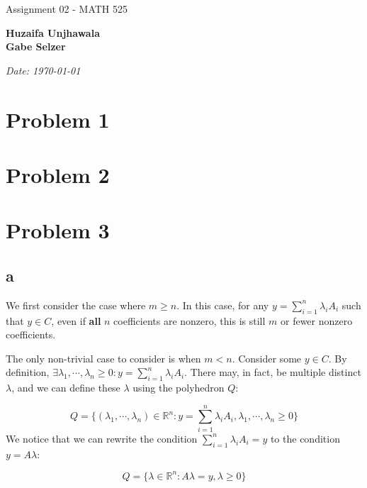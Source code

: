 \documentclass[11pt]{article}
\begin{document}
\begin{titlepage}
    \centering
    \vspace*{0.5cm}
    \par\normalfont\fontsize{35}{35}\sffamily\selectfont
    Assignment 02 - MATH 525\par 
    \vspace*{1cm}
    {\huge\bfseries Huzaifa Unjhawala \\  Gabe Selzer \par} 
    \vspace*{1cm}
    {\Large\itshape Date: \today\par} 
    \vfill
\end{titlepage}

\tableofcontents
\newpage

\section*{Problem 1}

\section*{Problem 2}

\section*{Problem 3}
\subsection{a}

We first consider the case where $m\geq n$. In this case, for any $y=\sum_{i=1}^n\lambda_iA_i$ such that $y\in C$, even if \textbf{all} $n$ coefficients are nonzero, this is still $m$ or fewer nonzero coefficients.

The only non-trivial case to consider is when $m<n$. Consider some $y\in C$. By definition, $\exists \lambda_1, \cdots, \lambda_n\geq 0:y=\sum_{i=1}^n\lambda_i A_i$. There may, in fact, be multiple distinct $\lambda$, and we can define these $\lambda$ using the polyhedron $Q$:

$$
Q=\bigl\{(\lambda_1, \cdots,\lambda_n)\in\mathbb{R}^n:y=\sum_{i=1}^n\lambda_iA_i, \lambda_1, \cdots, \lambda_n \geq 0\bigr\}
$$
We notice that we can rewrite the condition $\sum_{i=1}^n\lambda_iA_i=y$ to the condition $y=A\lambda$:

$$
Q=\bigl\{\lambda\in\mathbb{R}^n:A\lambda=y, \lambda\geq 0\bigr\}
$$
\end{document}
